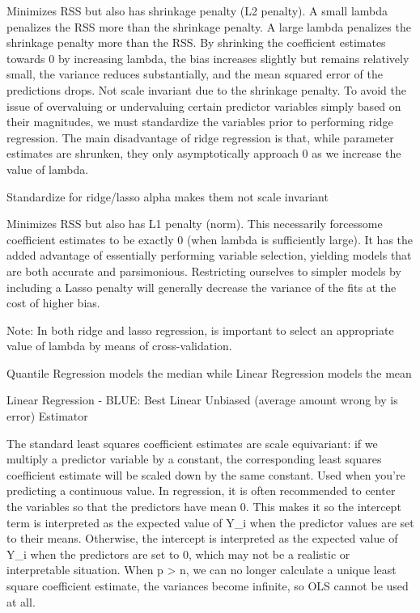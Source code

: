 \documentclass[]{book}
\begin{document}
Minimizes RSS but also has shrinkage penalty (L2 penalty). A small lambda penalizes the RSS more than the shrinkage penalty. A large lambda penalizes the shrinkage penalty more than the RSS. By shrinking the coefficient estimates towards 0 by increasing lambda, the bias increases slightly but remains relatively small, the variance reduces substantially, and the mean squared error of the predictions drops. Not scale invariant due to the shrinkage penalty. To avoid the issue of overvaluing or undervaluing certain predictor variables simply based on their magnitudes, we must standardize the variables prior to performing ridge regression. The main disadvantage of ridge regression is that, while parameter estimates are shrunken, they only asymptotically approach 0 as we increase the value of lambda.

Standardize for ridge/lasso alpha makes them not scale invariant

Minimizes RSS but also has L1 penalty (norm). This necessarily forcessome coefficient estimates to be exactly 0 (when lambda is sufficiently large). It has the added advantage of essentially performing variable selection, yielding models that are both accurate and parsimonious. Restricting ourselves to simpler models by including a Lasso penalty will generally decrease the variance of the fits at the cost of higher bias.

Note: In both ridge and lasso regression, is important to select an appropriate value of lambda by means of cross-validation.

Quantile Regression models the median while Linear Regression models the mean

Linear Regression - BLUE: Best Linear Unbiased (average amount wrong by is error) Estimator

The standard least squares coefficient estimates are scale equivariant: if we multiply a predictor variable by a constant, the corresponding least squares coefficient estimate will be scaled down by the same constant. Used when you're predicting a continuous value. In regression, it is often recommended to center the variables so that the predictors have mean 0. This makes it so the intercept term is interpreted as the expected value of Y\_i when the predictor values are set to their means. Otherwise, the intercept is interpreted as the expected value of Y\_i when the predictors are set to 0, which may not be a realistic or interpretable situation. When p \textgreater{} n, we can no longer calculate a unique least square coefficient estimate, the variances become infinite, so OLS cannot be used at all.
\end{document}
